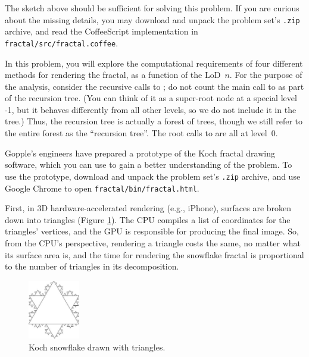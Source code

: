 \documentclass[12pt,twoside]{article}
\begin{document}
\begin{problems}
The sketch above should be sufficient for solving this problem. If you are
curious about the missing details, you may download and unpack the problem set's
\texttt{.zip} archive, and read the CoffeeScript implementation in
\texttt{fractal/src/fractal.coffee}.

In this problem, you will explore the computational requirements of four
different methods for rendering the fractal, as a function of the LoD~$n$.
For the purpose of the analysis, consider the recursive calls to
; do not count the main call to  as part
of the recursion tree.
(You can think of it as a super-root node at a special level -1, but it behaves 
differently from all other levels, so we do not include it in the tree.) Thus,
the recursion tree is actually a forest of trees, though we still refer to the
entire forest as the ``recursion tree''. The root calls to 
are all at level~$0$.

Gopple's engineers have prepared a prototype of the Koch fractal drawing
software, which you can use to gain a better understanding of the problem. To
use the prototype, download and unpack the problem set's \texttt{.zip} archive,
and use Google Chrome to open \texttt{fractal/bin/fractal.html}.



First, in 3D hardware-accelerated rendering (e.g., iPhone), surfaces are
broken down into triangles (Figure \ref{fig:snowflake-triangle}). The CPU
compiles a list of coordinates for the triangles' vertices, and the GPU
is responsible for producing the final image. So, from the CPU's
perspective, rendering a triangle costs the same, no matter what its surface
area is, and the time for rendering the snowflake fractal is proportional to the
number of triangles in its decomposition.

\begin{figure}[htbp]
\begin{center}
\includegraphics[width=0.2\textwidth]{figures/snowflake-triangle.pdf}
\end{center}
\caption{Koch snowflake drawn with triangles.}
\label{fig:snowflake-triangle}
\end{figure}


\end{problems}
\end{document}
